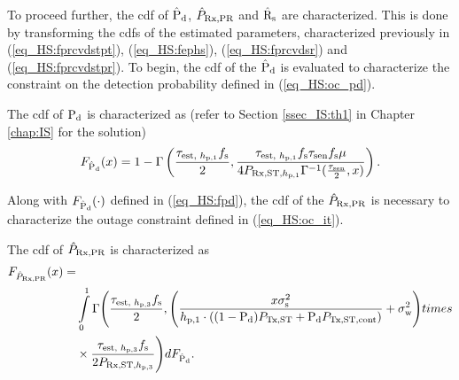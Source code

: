 To proceed further, the cdf of $\hat{\text{P}}_{\text{d}}$, $\hat{P}_{\text{Rx,PR}}$ and $\hat{\text{{R}}}_{\text{s}}$ are characterized. This is done by transforming the cdfs of the estimated parameters, characterized previously in (\ref{eq_HS:fprcvdstpt}), (\ref{eq_HS:fephs}), (\ref{eq_HS:fprcvdsr}) and (\ref{eq_HS:fprcvdstpr}). To begin, the cdf of the $\hat{\text{P}}_{\text{d}}$ is evaluated to characterize the constraint on the detection probability defined in (\ref{eq_HS:oc_pd}). 
\begin{lemma} \label{lm_HS:lem1}
\normalfont
The cdf of $\text{P}_{\text{d}}$ is characterized as (refer to Section \ref{ssec_IS:th1} in Chapter \ref{chap:IS} for the solution) 
\begin{align}
F_{\hat{\text{P}}_{\text{d}}}(x) = 1 - \Gamma \left(\frac{\tau_{\text{est, $h_{\text{p,1}}$}} f_{\text{s}}}{2}, \frac{\tau_{\text{est, $h_{\text{p,1}}$}} f_{\text{s}} \tau_{\text{sen}} f_{\text{s}} \mu}{4 P_{\text{Rx,ST,$h_{\text{p,1}}$}} \Gamma^{-1}(\frac{\tau_{\text{sen}}}{2}, x) } \right). 
\label{eq_HS:fpd}
\end{align}
\end{lemma}
Along with $F_{\hat{\text{P}}_{\text{d}}}(\cdot)$ defined in (\ref{eq_HS:fpd}), the cdf of the $\hat{P}_{\text{Rx,PR}}$ is necessary to characterize the outage constraint defined in (\ref{eq_HS:oc_it}). 
\begin{lemma} \label{lm_HS:lem2}
\normalfont
The cdf of $\hat{P}_{\text{Rx,PR}}$ is characterized as 
\begin{align}
F_{\hat{P}_{\text{Rx,PR}}} (x) =& \nonumber \\ 
&\int\limits_0^1 \Gamma \Bigg(\frac{\tau_{\text{est, $h_{\text{p,3}}$}} f_{\text{s}}}{2} , \Bigg( \frac{x \sigma^2_{\text{s}}}{h_{\text{p,1}} \cdot ((1 - \text{P}_{\text{d}}) P_{\text{Tx,ST}} + \text{P}_{\text{d}} P_{\text{Tx,ST,cont}})} + \sigma^2_{\text{w}}  \Bigg) times \nonumber \\ 
& \times  \frac{\tau_{\text{est, $h_{\text{p,3}}$}} f_{\text{s}}}{2 P_{\text{Rx,ST,$h_{\text{p,3}}$}}}  \Bigg) dF_{\hat{\text{P}}_{\text{d}}}. 
\label{eq_HS:fprcvdpr}
\end{align}
\end{lemma}

